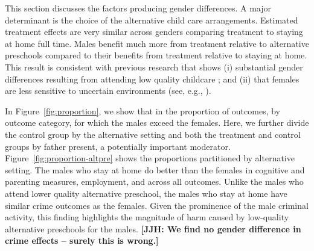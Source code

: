 This section discusses the factors producing gender differences. A major determinant is the choice of the alternative child care arrangements.
Estimated treatment effects are very similar across genders comparing treatment to staying at home full time. Males benefit much more from treatment relative to alternative preschools compared to their benefits from treatment relative to staying at home. This result is consistent with previous research that shows (i) substantial gender differences resulting from attending low quality childcare \citep{Kottelenberg-Lehrer_2014_Gender-Effects,Baker_Gruber_Milligan_2015_Noncog_Defects}; and (ii) that females are less sensitive to uncertain environments (see, e.g., \citealp{golding2016psychology,Autor-etal_2015_Family-Disadvantage}).

In Figure~\ref{fig:proportion}, we show that in the proportion of outcomes, by outcome category, for which the males exceed the females. Here, we further divide the control group by the alternative setting and both the treatment and control groups by father present, a potentially important moderator. Figure~\ref{fig:proportion-altpre} shows the proportions partitioned by alternative setting. The males who stay at home do better than the females in cognitive and parenting measures, employment, and across all outcomes. Unlike the males who attend lower quality alternative preschool, the males who stay at home have similar crime outcomes as the females. Given the prominence of the male criminal activity, this finding highlights the magnitude of harm caused by low-quality alternative preschools for the males. \textbf{[JJH: We find no gender difference in crime effects -- surely this is wrong.]}

